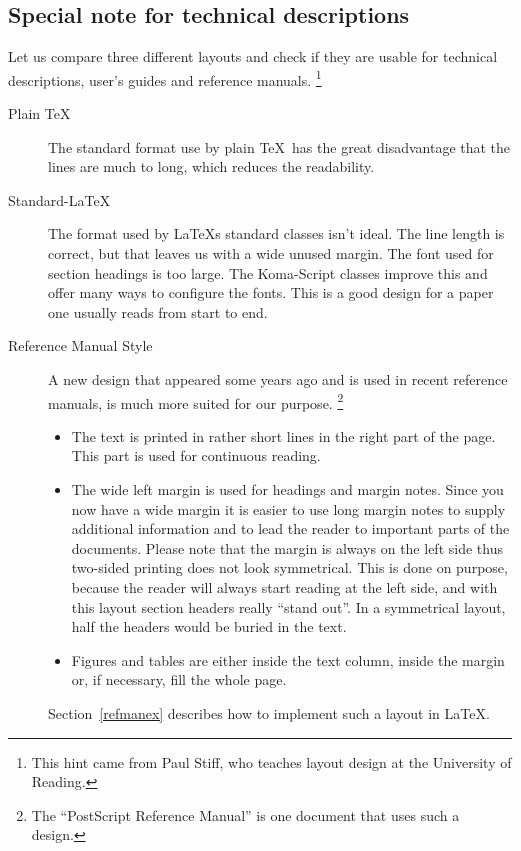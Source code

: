 \documentclass[twoside,a4paper]{refart}
\begin{document}
\subsection{Special note for technical descriptions}

Let us compare three different layouts and check if they are usable for 
technical descriptions, user's guides and reference manuals.  
\footnote{This hint came from Paul Stiff, who teaches layout design at 
the University of Reading.}

\begin{description}

\item[Plain \TeX]
        The standard format use by plain \TeX\ has the great disadvantage 
        that the lines are much to long, which reduces the readability.
        
\item[Standard-\LaTeX]
        The format used by \LaTeX{}s standard classes isn't ideal. The 
        line length is correct, but that leaves us with a wide unused margin. 
        The font used for section headings is too large. The Koma-Script 
        classes improve this and offer many ways to configure the fonts. 
        This is a good design for a paper one usually reads from start to 
        end.
        
\item[Reference Manual Style]
        A new design that appeared some years ago and is used in recent 
        reference manuals, is much more suited for our purpose.
        \footnote{The ``PostScript Reference Manual'' is one document that 
        uses such a design.}
\begin{itemize}
\item
        The text is printed in rather short lines in the right part of the 
        page. This part is used for continuous reading.
\item
        The wide left margin is used for headings and margin notes. Since 
        you now have a wide margin it is easier to use long margin notes to 
        supply additional information and to lead the reader to important 
        parts of the documents. Please note that the margin is always on the 
        left side thus two-sided printing does not look symmetrical. This is 
        done on purpose, because the reader will always start reading at the 
        left side, and with this layout section headers really ``stand out''. 
        In a symmetrical layout, half the headers would be buried in the text.
\item
        Figures and tables are either inside the text column, inside the
        margin or, if necessary, fill the whole page.
\end{itemize}

Section~\ref{refmanex} describes how to implement such a layout in 
\LaTeX.

\end{description}
\end{document}
